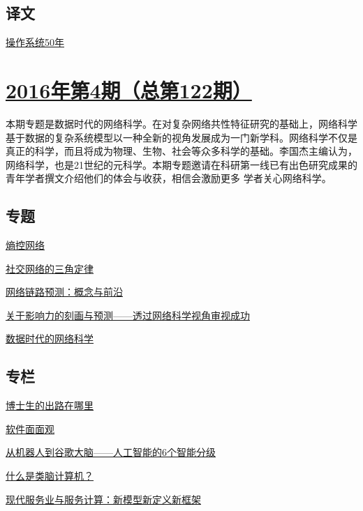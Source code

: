 \documentclass[a4paper]{article}
\begin{document}
\subsection{译文}
\href{http://history.ccf.org.cn/resources/1190201776262/2016/05/12/19.pdf}{操作系统50年}


\section{\href{http://history.ccf.org.cn/sites/ccf/jsjtbbd.jsp?contentId=2917443956516}{\textbf{2016年第4期（总第122期）}}}
本期专题是数据时代的网络科学。在对复杂网络共性特征研究的基础上，网络科学基于数据的复杂系统模型以一种全新的视角发展成为一门新学科。网络科学不仅是真正的科学，而且将成为物理、生物、社会等众多科学的基础。李国杰主编认为，网络科学，也是21世纪的元科学。本期专题邀请在科研第一线已有出色研究成果的青年学者撰文介绍他们的体会与收获，相信会激励更多
学者关心网络科学。
\subsection{专题}
\href{http://history.ccf.org.cn/resources/1190201776262/2016/04/11/夏.pdf}{熵控网络}

\href{http://history.ccf.org.cn/resources/1190201776262/2016/04/11/唐杰.pdf}{社交网络的三角定律}

\href{http://history.ccf.org.cn/resources/1190201776262/2016/04/11/周涛.pdf}{网络链路预测：概念与前沿}

\href{http://history.ccf.org.cn/resources/1190201776262/2016/04/11/宋朝鸣.pdf}{关于影响力的刻画与预测——透过网络科学视角审视成功}

\href{http://history.ccf.org.cn/resources/1190201776262/2016/04/11/汪小帆.pdf}{数据时代的网络科学}

\subsection{专栏}
\href{http://history.ccf.org.cn/resources/1190201776262/2016/04/11/鲍海飞.pdf}{博士生的出路在哪里}

\href{http://history.ccf.org.cn/resources/1190201776262/2016/04/11/David.pdf}{软件面面观}

\href{http://history.ccf.org.cn/resources/1190201776262/2016/04/11/刘锋.pdf}{从机器人到谷歌大脑——人工智能的6个智能分级}

\href{http://history.ccf.org.cn/resources/1190201776262/2016/04/11/陈云霁.pdf}{什么是类脑计算机？}

\href{http://history.ccf.org.cn/resources/1190201776262/2016/04/11/吴朝晖.pdf}{现代服务业与服务计算：新模型新定义新框架}
\end{document}
